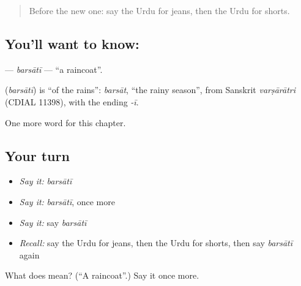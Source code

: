 \label{lesson:UR-C251-barsati}



\begin{quote}
Before the new one: say the Urdu for jeans, then the Urdu for shorts.
\end{quote}

\subsection*{You'll want to know: }
\textbf{} — \emph{barsātī} — \textquotedblleft{}a raincoat\textquotedblright{}.

\begin{cousinweb}
\textbf{} (\emph{barsātī}) is \textquotedblleft{}of the rains\textquotedblright{}: \emph{barsāt}, \textquotedblleft{}the rainy season\textquotedblright{}, from Sanskrit \emph{varṣārātri} (CDIAL 11398), with the ending \emph{-ī}.
\end{cousinweb}

\begin{grammarlens}[title={What you've built}]
One more word for this chapter.
\end{grammarlens}

\subsection*{Your turn}
\begin{itemize}
\raggedright
  \item \emph{Say it:} \emph{barsātī}
  \item \emph{Say it:} \emph{barsātī}, once more
  \item \emph{Say it:} say \emph{barsātī}
  \item \emph{Recall:} say the Urdu for jeans, then the Urdu for shorts, then say \emph{barsātī} again
\end{itemize}

\begin{tcolorbox}[breakable,colback=teal!4,colframe=teal!35!black,title={Before you move on}]
What does  mean? (\textquotedblleft{}A raincoat\textquotedblright{}.) Say it once more.
\end{tcolorbox}

